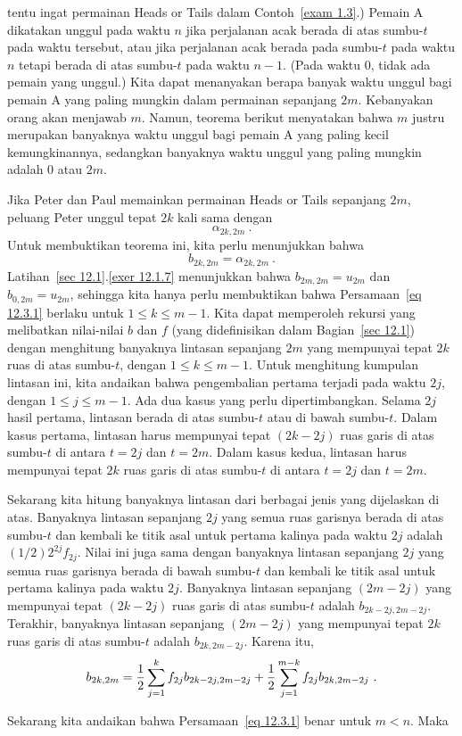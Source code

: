 tentu ingat permainan Heads or Tails dalam Contoh~\ref{exam 1.3}.) Pemain A
dikatakan unggul pada waktu $n$ jika perjalanan acak berada di atas sumbu-$t$
pada waktu tersebut, atau jika perjalanan acak berada pada sumbu-$t$ pada
waktu $n$ tetapi berada di atas sumbu-$t$ pada waktu $n-1$. (Pada waktu 0,
tidak ada pemain yang unggul.) Kita dapat menanyakan berapa banyak waktu unggul
bagi pemain A yang paling mungkin dalam permainan sepanjang $2m$. Kebanyakan
orang akan menjawab $m$. Namun, teorema berikut menyatakan bahwa $m$ justru
merupakan banyaknya waktu unggul bagi pemain A yang paling kecil kemungkinannya,
sedangkan banyaknya waktu unggul yang paling mungkin adalah 0 atau $2m$.
\begin{theorem}\label{thm 12.3.1}
Jika Peter dan Paul memainkan permainan Heads or Tails sepanjang $2m$, peluang
Peter unggul tepat $2k$ kali sama dengan
$$
\alpha_{2k, 2m}\ .
$$
\proof
Untuk membuktikan teorema ini, kita perlu menunjukkan bahwa
\begin{equation}  
b_{2k, 2m} = \alpha_{2k, 2m}\ .
\label{eq 12.3.1}  
\end{equation}
Latihan~\ref{sec 12.1}.\ref{exer 12.1.7} menunjukkan bahwa
$b_{2m, 2m} = u_{2m}$ dan $b_{0, 2m} = u_{2m}$, sehingga kita hanya perlu
membuktikan bahwa Persamaan~\ref{eq 12.3.1} berlaku untuk
$1 \le k \le m-1$. Kita dapat memperoleh rekursi yang melibatkan nilai-nilai
$b$ dan $f$ (yang didefinisikan dalam Bagian~\ref{sec 12.1}) dengan menghitung
banyaknya lintasan sepanjang $2m$ yang mempunyai tepat $2k$ ruas di atas
sumbu-$t$, dengan $1 \le k \le m-1$. Untuk menghitung kumpulan lintasan ini,
kita andaikan bahwa pengembalian pertama terjadi pada waktu $2j$, dengan
$1 \le j \le m-1$. Ada dua kasus yang perlu dipertimbangkan. Selama $2j$ hasil
pertama, lintasan berada di atas sumbu-$t$ atau di bawah sumbu-$t$. Dalam kasus pertama,
lintasan harus mempunyai tepat $(2k - 2j)$ ruas garis di atas sumbu-$t$ di
antara $t = 2j$ dan $t = 2m$. Dalam kasus kedua, lintasan harus mempunyai tepat
$2k$ ruas garis di atas sumbu-$t$ di antara $t = 2j$ dan $t = 2m$.
\par Sekarang kita hitung banyaknya lintasan dari berbagai jenis yang dijelaskan
di atas. Banyaknya lintasan sepanjang $2j$ yang semua ruas garisnya berada di
atas sumbu-$t$ dan kembali ke titik asal untuk pertama kalinya pada waktu $2j$
adalah $(1/2)2^{2j}f_{2j}$. Nilai ini juga sama dengan banyaknya lintasan
sepanjang $2j$ yang semua ruas garisnya berada di bawah sumbu-$t$ dan kembali
ke titik asal untuk pertama kalinya pada waktu $2j$. Banyaknya lintasan
sepanjang $(2m - 2j)$ yang mempunyai tepat $(2k - 2j)$ ruas garis di atas
sumbu-$t$ adalah $b_{2k-2j, 2m-2j}$. Terakhir, banyaknya lintasan sepanjang
$(2m-2j)$ yang mempunyai tepat $2k$ ruas garis di atas sumbu-$t$ adalah
$b_{2k,2m-2j}$. Karena itu,
$$b_{2k,2m} = {1\over 2} \sum_{j = 1}^k f_{2j}b_{2k-2j, 2m-2j} + 
{1\over 2}\sum_{j = 1}^{m-k} f_{2j}b_{2k, 2m-2j}\ .$$
\par
Sekarang kita andaikan bahwa Persamaan~\ref{eq 12.3.1} benar untuk $m < n$.
Maka


\end{theorem}
